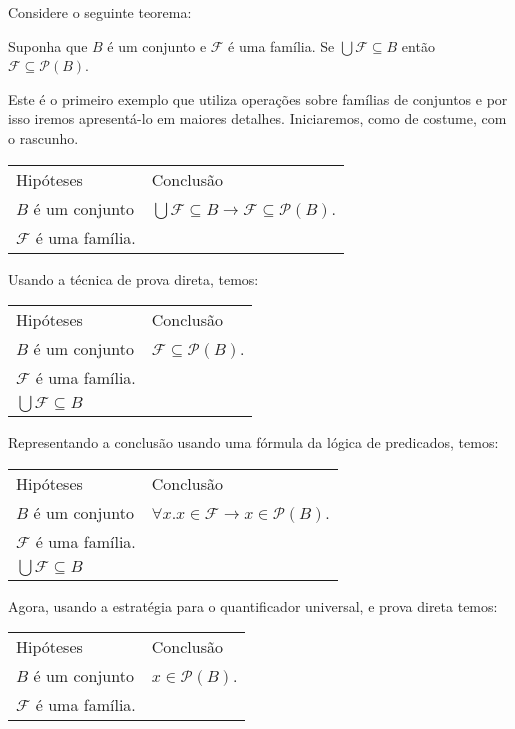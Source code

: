 \begin{Example}
Considere o seguinte teorema:
\begin{flushleft}
Suponha que $B$ é um conjunto e $\mathcal{F}$ é uma família. Se
$\bigcup \mathcal{F}\subseteq B$ então $\mathcal{F}\subseteq \mathcal{P}(B)$.
\end{flushleft}
Este é o primeiro exemplo que utiliza operações sobre famílias de
conjuntos e por isso iremos apresentá-lo em maiores
detalhes. Iniciaremos, como de costume, com o rascunho.
\begin{flushleft}
\begin{tabular}{ll}
Hipóteses & Conclusão \\
$B$ é um conjunto & $\bigcup \mathcal{F} \subseteq B \to
\mathcal{F}\subseteq \mathcal{P}(B)$. \\
$\mathcal{F}$ é uma família.
\end{tabular}
\end{flushleft}
Usando a técnica de prova direta, temos:
\begin{flushleft}
\begin{tabular}{ll}
Hipóteses & Conclusão \\
$B$ é um conjunto & $\mathcal{F}\subseteq \mathcal{P}(B)$. \\
$\mathcal{F}$ é uma família. & \\
$\bigcup \mathcal{F} \subseteq B$ & \\
\end{tabular}
\end{flushleft}
Representando a conclusão usando uma fórmula da lógica de predicados,
temos:
\begin{flushleft}
\begin{tabular}{ll}
Hipóteses & Conclusão \\
$B$ é um conjunto & $\forall x. x\in \mathcal{F} \to x\in\mathcal{P}(B)$. \\
$\mathcal{F}$ é uma família. & \\
$\bigcup \mathcal{F} \subseteq B$ & \\
\end{tabular}
\end{flushleft}
Agora, usando a estratégia para o quantificador universal, e prova direta temos:
\begin{flushleft}
\begin{tabular}{ll}
Hipóteses & Conclusão \\
$B$ é um conjunto & $ x\in\mathcal{P}(B)$. \\
$\mathcal{F}$ é uma família. & \\

\end{tabular}
\end{flushleft}
\end{Example}
